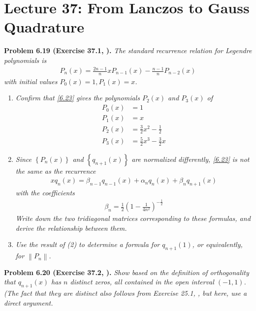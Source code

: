 \documentclass[a4paper,oneside]{book}
\numberwithin{equation}{chapter}
\begin{document}
\section{Lecture 37: From Lanczos to Gauss Quadrature}
\textbf{Problem 6.19 (Exercise 37.1, \cite{1}).} \textit{The standard recurrence relation for Legendre polynomials is}
\begin{align}
\label{6.23}
{P_n}\left( x \right) = \frac{{2n - 1}}{n}x{P_{n - 1}}\left( x \right) - \frac{{n - 1}}{n}{P_{n - 2}}\left( x \right)
\end{align}
\textit{with initial values $P_0\left(x\right)=1,P_1\left(x\right)=x$.}
\begin{enumerate}
\item \textit{Confirm that \eqref{6.23} gives the polynomials $P_2\left(x\right)$ and $P_3\left(x\right)$ of}
\begin{align}
{P_0}\left( x \right) &= 1\\
{P_1}\left( x \right) &= x\\
{P_2}\left( x \right) &= \frac{3}{2}{x^2} - \frac{1}{2}\\
{P_3}\left( x \right) &= \frac{5}{2}{x^3} - \frac{3}{2}x
\end{align}
\item \textit{Since $\left\{ {{P_n}\left( x \right)} \right\}$ and $\left\{ {{q_{n + 1}}\left( x \right)} \right\}$  are normalized differently, \eqref{6.23} is not the same as the recurrence}
\begin{align}
x{q_n}\left( x \right) = {\beta _{n - 1}}{q_{n - 1}}\left( x \right) + {\alpha _n}{q_n}\left( x \right) + {\beta _n}{q_{n + 1}}\left( x \right)
\end{align}
\textit{with the coefficients}
\begin{align}
{\beta _n} = \frac{1}{2}{\left( {1 - \frac{1}{{4{n^2}}}} \right)^{ - \frac{1}{2}}}
\end{align}
\textit{Write down the two tridiagonal matrices corresponding to these formulas, and derive the relationship between them.}
\item \textit{Use the result of (2) to determine a formula for $q_{n+1}\left(1\right)$, or equivalently, for $\left\|P_n\right\|$.}
\end{enumerate}
\textbf{Problem 6.20 (Exercise 37.2, \cite{1}).} \textit{Show based on the definition of orthogonality that $q_{n+1}\left(x\right)$ has $n$ distinct zeros, all contained in the open interval $\left(-1,1\right)$. (The fact that they are distinct also follows from Exercise 25.1, \cite{1}, but here, use a direct argument.}\\
\end{document}
